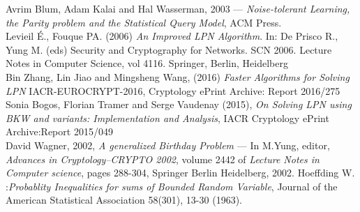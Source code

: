 \documentclass{article}
\begin{document}
  \begin{thebibliography}{99}
  	 Avrim Blum, Adam Kalai and Hal Wasserman, 2003 --- \emph{Noise-tolerant Learning, the Parity problem and the Statistical Query Model}, ACM Press.\\
  	 Levieil É., Fouque PA. (2006) \emph{An Improved LPN Algorithm}. In: De Prisco R., Yung M. (eds) Security and Cryptography for Networks. SCN 2006. Lecture Notes in Computer Science, vol 4116. Springer, Berlin, Heidelberg\\
  	 Bin Zhang, Lin Jiao and Mingsheng Wang, (2016) \emph{Faster Algorithms for Solving LPN} IACR-EUROCRYPT-2016, Cryptology ePrint Archive: Report 2016/275\\
  	 Sonia Bogos, Florian Tramer and Serge Vaudenay (2015), \emph{On Solving LPN using BKW and variants: Implementation and Analysis}, IACR Cryptology ePrint Archive:Report 2015/049\\
  	 David Wagner, 2002, \emph{A generalized Birthday Problem} --- In M.Yung, editor, \emph{Advances in Cryptology--CRYPTO 2002}, volume 2442 of \emph{Lecture Notes in Computer science}, pages 288-304, Springer Berlin Heidelberg, 2002.
  	 Hoeffding W. :\emph{Probablity Inequalities for sums of Bounded Random Variable}, Journal of the American Statistical Association 58(301), 13-30 (1963).
  	 \\
  	
  \end{thebibliography}
\end{document}

